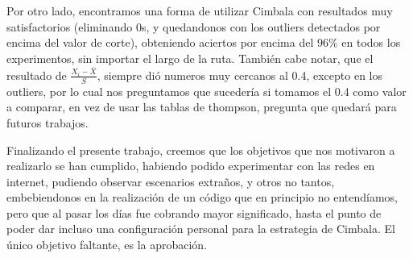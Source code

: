 Por otro lado, encontramos una forma de utilizar Cimbala con resultados muy satisfactorios (eliminando 0s, y quedandonos con los outliers detectados por encima del valor de corte), obteniendo aciertos por encima del $96 \%$ en todos los experimentos, sin importar el largo de la ruta. También cabe notar, que el resultado de $\frac{X_i - \bar{X}}{S}$, siempre dió numeros muy cercanos al 0.4, excepto en los outliers, por lo cual nos preguntamos que sucedería si tomamos el 0.4 como valor a comparar, en vez de usar las tablas de thompson, pregunta que quedará para futuros trabajos.

Finalizando el presente trabajo, creemos que los objetivos que nos motivaron a realizarlo se han cumplido, habiendo podido experimentar con las redes en internet, pudiendo observar escenarios extraños, y otros no tantos, embebiendonos en la realización de un código que en principio no entendíamos, pero que al pasar los días fue cobrando mayor significado, hasta el punto de poder dar incluso una configuración personal para la estrategia de Cimbala. El único objetivo faltante, es la aprobación.


